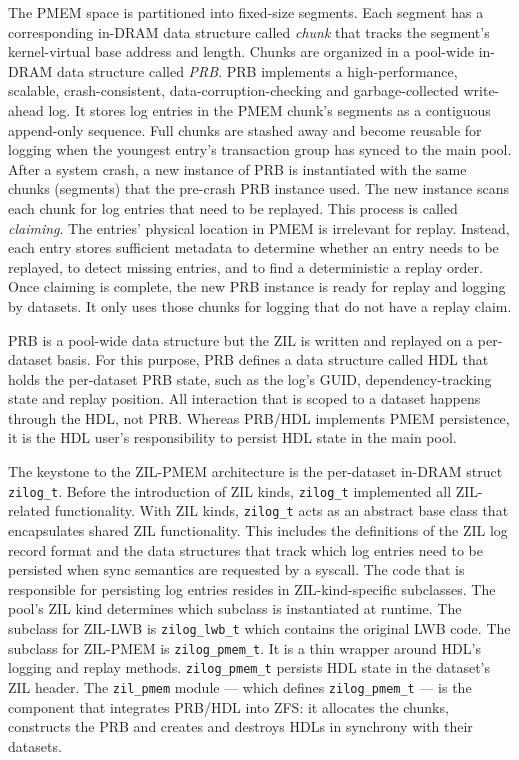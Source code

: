 \documentclass[12pt,a4paper,twoside,draft]{book}
\begin{document}
The PMEM space is partitioned into fixed-size segments.
Each segment has a corresponding in-DRAM data structure called \textit{chunk} that tracks the segment's kernel-virtual base address and length.
Chunks are organized in a pool-wide in-DRAM data structure called \textit{PRB}.
PRB implements a high-performance, scalable, crash-consistent, data-corruption-checking and garbage-collected write-ahead log.
It stores log entries in the PMEM chunk's segments as a contiguous append-only sequence.
Full chunks are stashed away and become reusable for logging when the youngest entry's transaction group has synced to the main pool.
After a system crash, a new instance of PRB is instantiated with the same chunks (segments) that the pre-crash PRB instance used.
The new instance scans each chunk for log entries that need to be replayed.
This process is called \textit{claiming}.
The entries' physical location in PMEM is irrelevant for replay.
Instead, each entry stores sufficient metadata to determine whether an entry needs to be replayed, to detect missing entries, and to find a deterministic a replay order.
Once claiming is complete, the new PRB instance is ready for replay and logging by datasets.
It only uses those chunks for logging that do not have a replay claim.

PRB is a pool-wide data structure but the ZIL is written and replayed on a per-dataset basis.
For this purpose, PRB defines a data structure called HDL that holds the per-dataset PRB state, such as the log's GUID, dependency-tracking state and replay position.
All interaction that is scoped to a dataset happens through the HDL, not PRB.
Whereas PRB/HDL implements PMEM persistence, it is the HDL user's responsibility to persist HDL state in the main pool.

The keystone to the ZIL-PMEM architecture is the per-dataset in-DRAM struct \lstinline{zilog_t}.
Before the introduction of ZIL kinds, \lstinline{zilog_t} implemented all ZIL-related functionality.
With ZIL kinds, \lstinline{zilog_t} acts as an abstract base class that encapsulates shared ZIL functionality.
This includes the definitions of the ZIL log record format and the data structures that track which log entries need to be persisted when sync semantics are requested by a syscall.
The code that is responsible for persisting log entries resides in ZIL-kind-specific subclasses.
The pool's ZIL kind determines which subclass is instantiated at runtime.
The subclass for ZIL-LWB is \lstinline{zilog_lwb_t} which contains the original LWB code.
The subclass for ZIL-PMEM is \lstinline{zilog_pmem_t}.
It is a thin wrapper around HDL's logging and replay methods.
\lstinline{zilog_pmem_t} persists HDL state in the dataset's ZIL header.
The \lstinline{zil_pmem} module --- which defines \lstinline{zilog_pmem_t} --- is the component that integrates PRB/HDL into ZFS:
it allocates the chunks, constructs the PRB and creates and destroys HDLs in synchrony with their datasets.
\end{document}
